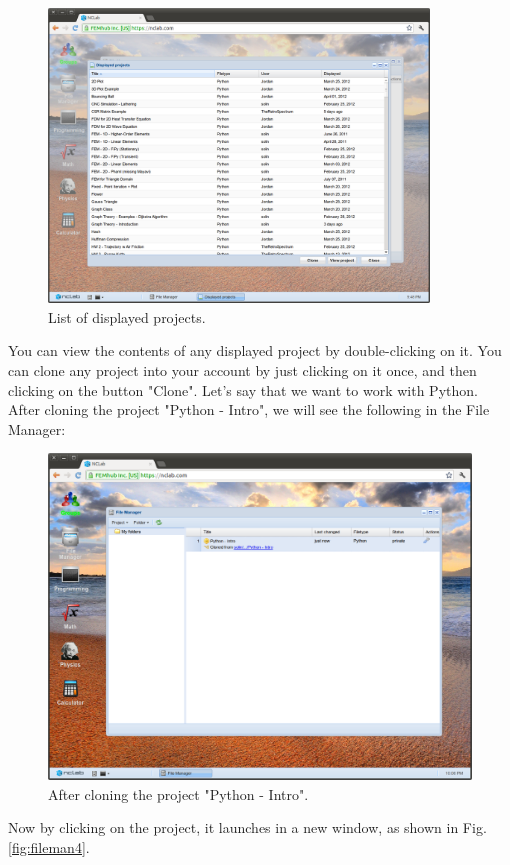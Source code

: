 \documentclass{article}
\begin{document}
\begin{figure}[!ht]
\begin{center}
\includegraphics[width=0.9\textwidth]{img/fileman2.png}
\end{center}
\vspace{-2mm}
\caption{List of displayed projects.}
\label{fig:fileman2}
\end{figure}
\noindent
You can view the contents of any displayed project by double-clicking on it. You can 
clone any project into your account by just clicking on it once, and then clicking on 
the button "Clone". Let's say that we want to work with Python. After cloning 
the project "Python - Intro", we will see the following in the File Manager:

\newpage

\begin{figure}[!ht]
\begin{center}
\includegraphics[width=\textwidth]{img/fileman3.png}
\end{center}
\caption{After cloning the project "Python - Intro".}
\label{fig:fileman3}
\end{figure}
\noindent
Now by clicking on the project, it launches in a new window, as
shown in Fig. \ref{fig:fileman4}.
\end{document}
